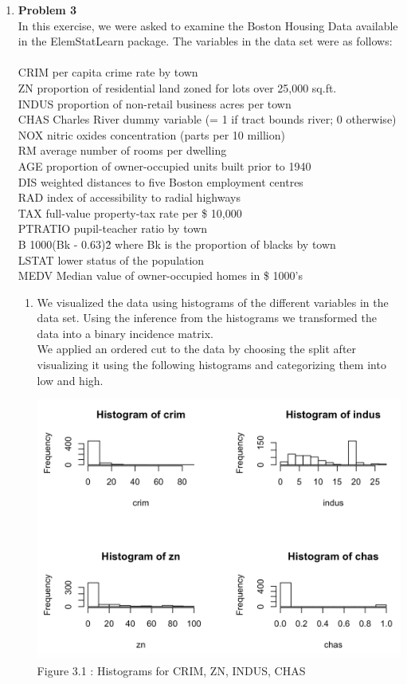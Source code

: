 \documentclass[11pt]{article}
\begin{document}
\begin{enumerate}
\item \textbf{Problem 3}
\\
In this exercise, we were asked to examine the Boston Housing Data available in the ElemStatLearn package. The variables in the data set were as follows:
\\
\\CRIM per capita crime rate by town
\\ZN proportion of residential land zoned for lots over 25,000 sq.ft.
\\INDUS proportion of non-retail business acres per town
\\CHAS Charles River dummy variable (= 1 if tract bounds river; 0 otherwise)
\\NOX nitric oxides concentration (parts per 10 million)
\\RM average number of rooms per dwelling
\\AGE proportion of owner-occupied units built prior to 1940
\\DIS weighted distances to five Boston employment centres
\\RAD index of accessibility to radial highways
\\TAX full-value property-tax rate per \$ 10,000
\\PTRATIO pupil-teacher ratio by town
\\B 1000(Bk - 0.63)\^2  where Bk is the proportion of blacks by town
\\LSTAT lower status of the population
\\MEDV Median value of owner-occupied homes in \$ 1000's

\begin{enumerate}
    \item We visualized the data using histograms of the different variables in the data set. Using the inference from the histograms we transformed the data into a binary incidence matrix.
    \\We applied an ordered cut to the data by choosing the split after visualizing it using the following histograms and categorizing them into  low and high.
\begin{center}
    \includegraphics[height=0.5\textwidth]{s1_1.png}
    \\\footnotesize Figure 3.1 : Histograms for CRIM, ZN, INDUS, CHAS 


\end{center}
\end{enumerate}
\end{enumerate}
\end{document}
